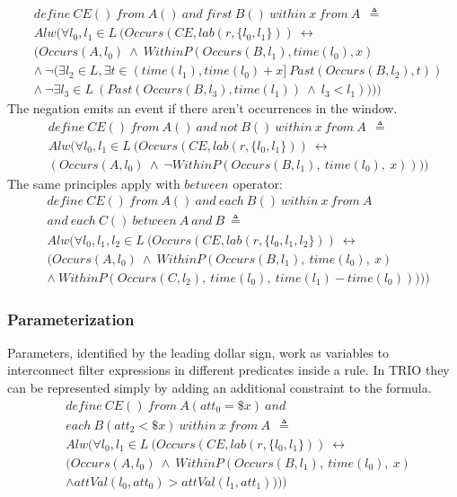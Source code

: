 \begin{align*}
&define\ CE()\ from\ A()\ and\ first\ B()\ within\ x\ from\ A\ \ \triangleq\\
&Alw(\forall l_0, l_1 \in L\ (Occurs(CE, lab(r, \{l_0, l_1\}))\ \leftrightarrow\\
&(Occurs(A, l_0)\ \wedge\ WithinP(Occurs(B, l_1),time(l_0),x)\\
&\wedge\ \neg (\exists l_2 \in L, \exists t\in (time(l_1), time(l_0) + x]\ Past(Occurs(B, l_2),t))\\
&\wedge\ \neg \exists l_3 \in L\ (Past(Occurs(B, l_3), time(l_1))\ \wedge\ l_3 < l_1))))
\end{align*}
The negation emits an event if there aren't occurrences in the window.
\begin{align*}
&define\ CE()\ from\ A()\ and\ not\ B()\ within\ x\ from\ A\ \ \triangleq\\
&Alw(\forall l_0, l_1 \in L\ (Occurs(CE, lab(r, \{l_0, l_1\}))\ \leftrightarrow\\
&(Occurs(A, l_0)\ \wedge\ \neg WithinP(Occurs(B, l_1),\ time(l_0),\ x))))
\end{align*}
The same principles apply with $between$ operator:
\begin{align*}
&define\ CE()\ from\ A()\ and\ each\ B()\ within\ x\ from\ A\\
&and\ each\ C()\ between\ A\ and\ B\ \triangleq\\
&Alw(\forall l_0, l_1, l_2 \in L\ (Occurs(CE, lab(r, \{l_0, l_1, l_2\}))\ \leftrightarrow\\
&(Occurs(A, l_0)\ \wedge\ WithinP(Occurs(B, l_1),\ time(l_0),\ x)\\
&\wedge\ WithinP(Occurs(C, l_2),\ time(l_0),\ time(l_1) - time(l_0)))))
\end{align*}

\subsubsection{Parameterization}
Parameters, identified by the leading dollar sign, work as variables to interconnect filter expressions in different predicates inside a rule. In TRIO they can be represented simply by adding an additional constraint to the formula.
\begin{align*}
&define\ CE()\ from\ A(att_0 = \$x)\ and\\
&each\ B(att_2 < \$x)\ within\ x\ from\ A\ \ \triangleq\\
&Alw(\forall l_0, l_1 \in L\ (Occurs(CE, lab(r, \{l_0, l_1\}))\ \leftrightarrow\\
&(Occurs(A, l_0)\ \wedge\ WithinP(Occurs(B, l_1),\ time(l_0),\ x)\\
&\wedge attVal(l_0, att_0) > attVal(l_1, att_1))))
\end{align*}

